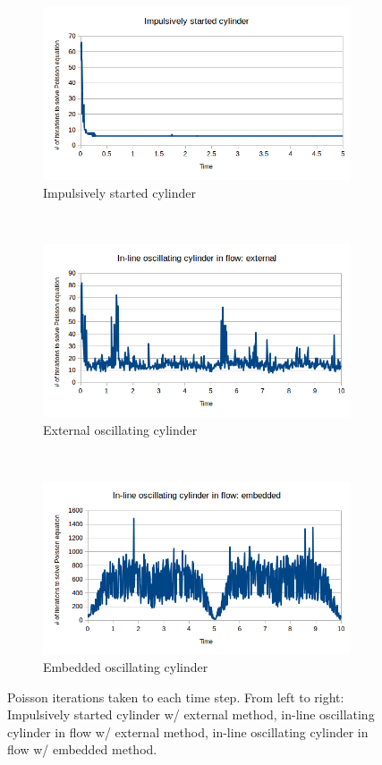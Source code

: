 \documentclass[onehalf,11pt]{beavtex}
\begin{document}
\begin{figure}[htb]
	\centering
	\begin{subfigure}{0.3\textwidth}
		\includegraphics[width=\linewidth]{cy_iter}
		\caption{Impulsively started cylinder}
	\end{subfigure}
	~
	\begin{subfigure}{0.3\textwidth}
		\includegraphics[width=\linewidth]{ex_iter}
		\caption{External oscillating cylinder}
	\end{subfigure}
	~
	\begin{subfigure}{0.3\textwidth}
		\includegraphics[width=\linewidth]{em_iter}
		\caption{Embedded oscillating cylinder}
	\end{subfigure}
	\caption{Poisson iterations taken to each time step. From left to right: Impulsively started cylinder w/ external method, in-line oscillating cylinder in flow w/ external method, in-line oscillating cylinder in flow w/ embedded method.}
	\label{fig:iter}
\end{figure}
\end{document}
